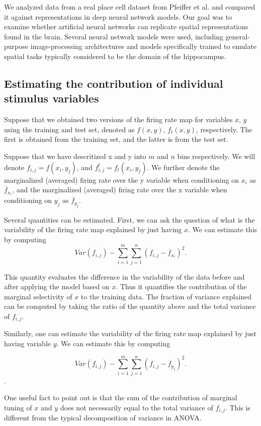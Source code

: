 \documentclass[11pt]{article}
\begin{document}
We analyzed data from a real place cell dataset from Pfeiffer et al. and compared it against representations in deep neural network models. Our goal was to examine whether artificial neural networks can replicate spatial representations found in the brain. Several neural network models were used, including general-purpose image-processing architectures and models specifically trained to emulate spatial tasks typically considered to be the domain of the hippocampus.

\subsection{Estimating the contribution of individual stimulus variables}

Suppose that we obtained two versions of the firing rate map for  variables $x$, $y$ using the training and test set, denoted as $f(x,y)$, $f_t(x,y)$, respectively. The first is obtained from the training set, and the latter is from the test set. 

Suppose that we have descritized x and y into $m$ and $n$ bins respectively. We will denote $f_{i,j}=f(x_i,y_j)$, and $f^{t}_{i,j}=f_t(x_i,y_j)$. We further denote the marginalized (averaged) firing rate over the y variable when conditioning on $x_i$ as $\overline{f}_{x_i}$, and the marginalized (averaged) firing rate over the x variable when conditioning on $y_j$ as $\overline{f}_{y_j}$.

Several quantities can be estimated. First, we can ask the question of what is the variability of the firing rate map explained by just having $x$. We can estimate this by computing 
$$
Var(f_{i,j})- \sum_{i=1}^m\sum_{j=1}^n (f_{i,j}-\overline{f}_{x_i})^2.
$$

This quantity evaluates the difference in the variability of the data before and after applying the model based on $x$. Thus it quantifies the contribution of the marginal selectivity of $x$ to the training data. 
The fraction of variance explained can be computed by taking the ratio of the quantity above and the total variance of $f_{i,j}$.

Similarly, one can estimate the variability of the firing rate map explained by just having variable $y$. We can estimate this by computing 

$$
Var(f_{i,j})- \sum_{i=1}^m\sum_{j=1}^n (f_{i,j}-\overline{f}_{y_j})^2.
$$. 

One useful fact to point out is that the sum of the contribution of marginal tuning of $x$ and $y$ does not necessarily equal to the total variance of $f_{i,j}$. This is different from the typical decomposition of variance in ANOVA.
\end{document}
